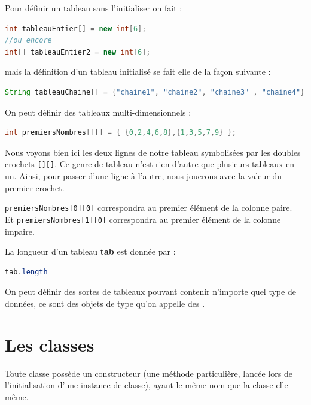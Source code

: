 \documentclass[a4paper,twoside]{article}
\begin{document}
Pour définir un tableau sans l'initialiser on fait :
\begin{lstlisting}[language=java]
int tableauEntier[] = new int[6];
//ou encore
int[] tableauEntier2 = new int[6];
\end{lstlisting}
mais la définition d'un tableau initialisé se fait elle de la façon suivante :
\begin{lstlisting}[language=java]
String tableauChaine[] = {"chaine1", "chaine2", "chaine3" , "chaine4"};
\end{lstlisting}

\bigskip

On peut définir des tableaux multi-dimensionnels : 
\begin{lstlisting}[language=java]
int premiersNombres[][] = { {0,2,4,6,8},{1,3,5,7,9} };
\end{lstlisting}

Nous voyons bien ici les deux lignes de notre tableau symbolisées par les doubles crochets \texttt{[][]}. Ce genre de tableau n'est rien d'autre que plusieurs tableaux en un. Ainsi, pour passer d'une ligne à l'autre, nous jouerons avec la valeur du premier crochet.
\begin{exemple}
\verb|premiersNombres[0][0]| correspondra au premier élément de la colonne paire.\\
Et \verb|premiersNombres[1][0]| correspondra au premier élément de la colonne impaire.
\end{exemple}

\begin{remarque}
La longueur d'un tableau \textbf{tab} est donnée par :
\begin{lstlisting}[language=java]
tab.length
\end{lstlisting}
\end{remarque}

\begin{important}
On peut définir des sortes de tableaux pouvant contenir n'importe quel type de données, ce sont des objets de type  qu'on appelle des . %
\end{important}


\section{Les classes}\label{sec:les_classes}
Toute classe possède un constructeur (une méthode particulière, lancée lors de l'initialisation d'une instance de classe), ayant le même nom que la classe elle-même.
\end{document}
